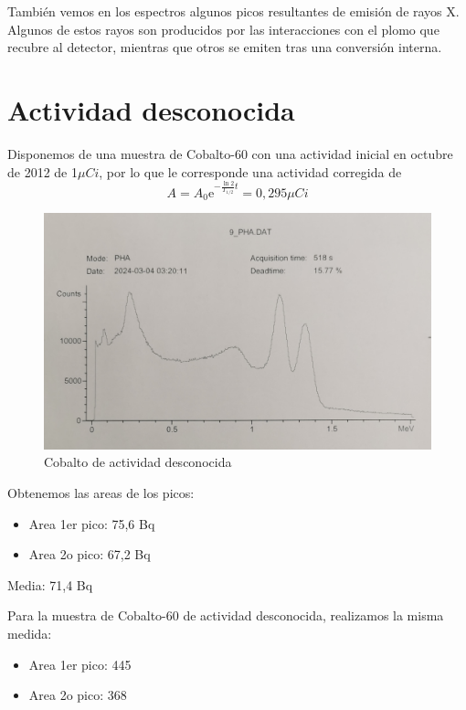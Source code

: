 \documentclass[a4paper,12pt,spanish]{article}
\begin{document}
	
	
	También vemos en los espectros algunos picos resultantes de emisión de rayos X. Algunos de estos rayos son producidos por las interacciones con el plomo que recubre al detector, mientras que otros se emiten tras una conversión interna.\\
	
	
	
	
	
	
	
	\section{Actividad desconocida}
	
	
	Disponemos de una muestra de Cobalto-60 con una actividad inicial en octubre de 2012 de 1$\si{\mu Ci}$, por lo que le corresponde una actividad corregida de 
	\[ A = A_0 \text{e}^{-\frac{\ln 2}{T_{1/2}}t} = 0,295\si{\mu Ci}
	\]
	
	\begin{figure}[H]
		\centering
		\includegraphics[width=0.7\linewidth]{../graficas_procesadas/PHA_9}
		\caption{Cobalto de actividad desconocida}
		\label{fig:pha9}
	\end{figure}
	
	Obtenemos las areas de los picos:
	\begin{itemize}
		\item Area 1er pico: 75,6 Bq
		\item Area 2o pico: 67,2 Bq
	\end{itemize}

	Media: 71,4 Bq
	
	\vspace{\baselineskip}
	
	Para la muestra de Cobalto-60 de actividad desconocida, realizamos la misma medida:
		\begin{itemize}
		\item Area 1er pico: 445
		\item Area 2o pico: 368
	\end{itemize}
	
\end{document}
